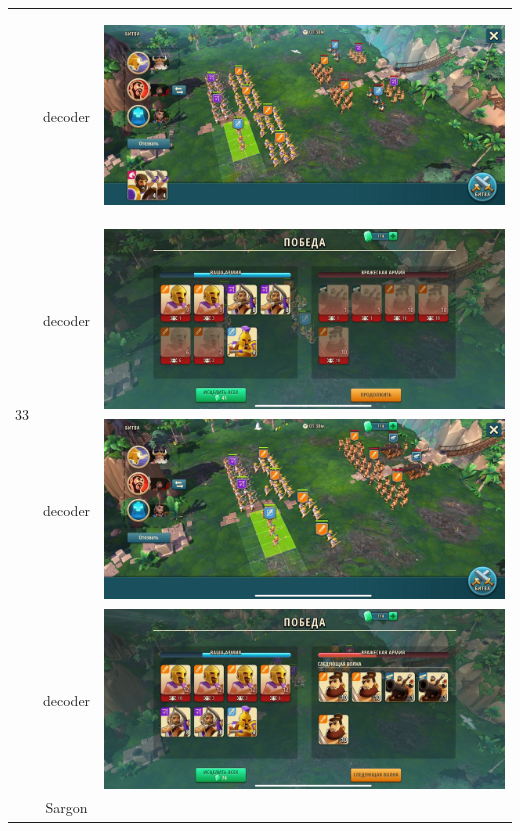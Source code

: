 \begin{longtable}{|c|c|c|}
	\hline
	\multirow{12}{*}{33} & decoder &
	\hypertarget{fight33}{\includegraphics[width=0.75\linewidth]{./parts/media/TreasureHunt/33/decoder/photo_2022-04-07_10-02-11.jpg}} \\
	& decoder &
	\includegraphics[width=0.75\linewidth]{./parts/media/TreasureHunt/33/decoder/photo_2022-04-07_10-02-27.jpg} \\
	& decoder &
	\includegraphics[width=0.75\linewidth]{./parts/media/TreasureHunt/33/decoder/photo_2022-04-07_10-02-23.jpg} \\
	& decoder &
	\includegraphics[width=0.75\linewidth]{./parts/media/TreasureHunt/33/decoder/photo_2022-04-07_10-02-19.jpg} \\
	\hline
	\multirow{12}{*}{34} & Sargon &

\end{longtable}
